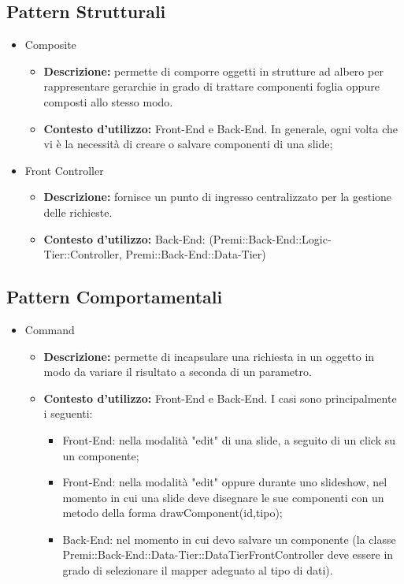 	\subsection{Pattern Strutturali}
		\begin{itemize}
			\item Composite
			\begin{itemize}
				\item \textbf{Descrizione:} permette di comporre oggetti in strutture ad albero per rappresentare gerarchie in grado di trattare componenti foglia oppure composti allo stesso modo.   
				\item \textbf{Contesto d'utilizzo:} Front-End e Back-End. In generale, ogni volta che vi è la necessità di creare o salvare componenti di una slide; 
			\end{itemize}
		\end{itemize}
		\begin{itemize}
			\item Front Controller
			\begin{itemize}
				\item \textbf{Descrizione:} fornisce un punto di ingresso centralizzato per la gestione delle richieste.
				\item \textbf{Contesto d'utilizzo:} Back-End: (Premi::Back-End::Logic-Tier::Controller, Premi::Back-End::Data-Tier)
			\end{itemize}
		\end{itemize}

	\subsection{Pattern Comportamentali}
		\begin{itemize}
			\item Command
			\begin{itemize}
				\item \textbf{Descrizione:} permette di incapsulare una richiesta in un oggetto in modo da variare il risultato a seconda di un parametro.
				\item \textbf{Contesto d'utilizzo:} Front-End e Back-End. I casi sono principalmente i seguenti:
				\begin{itemize}
					\item Front-End: nella modalità "edit" di una slide, a seguito di un click su un componente;
					\item Front-End: nella modalità "edit" oppure durante uno slideshow, nel momento in cui una slide deve disegnare le sue componenti con un metodo della forma drawComponent(id,tipo);
					\item Back-End: nel momento in cui devo salvare un componente (la classe Premi::Back-End::Data-Tier::DataTierFrontController deve essere in grado di selezionare il mapper adeguato al tipo di dati).
				\end{itemize}
			\end{itemize}
		\end{itemize}